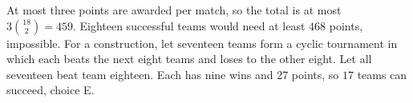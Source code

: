 At most three points are awarded per match, so the total is at most $3\binom{18}2=459$. Eighteen successful teams would need at least $468$ points, impossible. For a construction, let seventeen teams form a cyclic tournament in which each beats the next eight teams and loses to the other eight. Let all seventeen beat team eighteen. Each has nine wins and 27 points, so $\boxed{17}$ teams can succeed, choice E.
